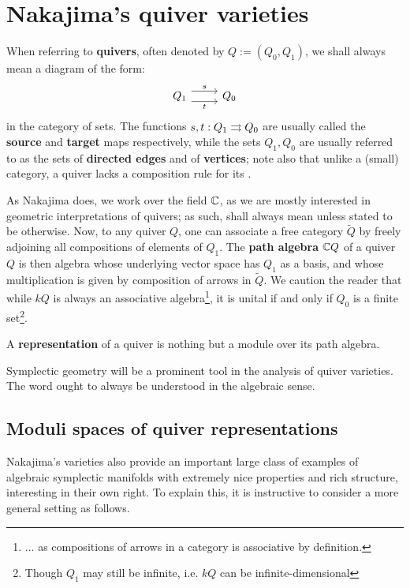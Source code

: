     \section{Nakajima's quiver varieties}
        \begin{convention}[Quivers]
            When referring to \textbf{quivers}, often denoted by $Q := (Q_0, Q_1)$, we shall always mean a diagram of the form:
                $$
                    \begin{tikzcd}
                	{Q_1} & {Q_0}
                	\arrow["t"', shift right=2, from=1-1, to=1-2]
                	\arrow["s", shift left=2, from=1-1, to=1-2]
                    \end{tikzcd}
                $$
            in the category of sets. The functions $s, t: Q_1 \rightrightarrows Q_0$ are usually called the \textbf{source} and \textbf{target} maps respectively, while the sets $Q_1, Q_0$ are usually referred to as the sets of \textbf{directed edges} and of \textbf{vertices}; note also that unlike a (small) category, a quiver lacks a composition rule for its . 

            As Nakajima does, we work over the field $\mathbb{C}$, as we are mostly interested in geometric interpretations of quivers; as such,  shall always mean  unless stated to be otherwise. Now, to any quiver $Q$, one can associate a free category $\tilde{Q}$ by freely adjoining all compositions of elements of $Q_1$. The \textbf{path algebra} $\mathbb{C} Q$ of a quiver $Q$ is then algebra whose underlying vector space has $Q_1$ as a basis, and whose multiplication is given by composition of arrows in $\tilde{Q}$. We caution the reader that while $kQ$ is always an associative algebra\footnote{... as compositions of arrows in a category is associative by definition.}, it is unital if and only if $Q_0$ is a finite set\footnote{Though $Q_1$ may still be infinite, i.e. $kQ$ can be infinite-dimensional}.

            A \textbf{representation} of a quiver is nothing but a module over its path algebra. 
        \end{convention}

        \begin{convention}
            Symplectic geometry will be a prominent tool in the analysis of quiver varieties. The word  ought to always be understood in the algebraic sense. 
        \end{convention}
    
        \subsection{Moduli spaces of quiver representations}
            Nakajima’s varieties also provide an important large class of examples of algebraic symplectic manifolds with extremely nice properties and rich structure, interesting in their own right. To explain this, it is instructive to consider a more general setting as follows.

